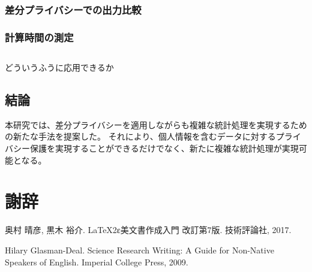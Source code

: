 \documentclass[a4paper,11pt]{jreport}
\begin{document}
\subsection{差分プライバシーでの出力比較}

\subsection{計算時間の測定}

\section{}
どういうふうに応用できるか

\section{結論}
本研究では、差分プライバシーを適用しながらも複雑な統計処理を実現するための新たな手法を提案した。
それにより、個人情報を含むデータに対するプライバシー保護を実現することができるだけでなく、新たに複雑な統計処理が実現可能となる。

\chapter*{謝辞}

\newpage

\renewcommand{\bibname}{参考文献}

%
%

\begin{thebibliography}{1}
奥村 晴彦, 黒木 裕介.
\newblock LaTeX2ε美文書作成入門 改訂第7版.
\newblock 技術評論社, 2017.

Hilary Glasman-Deal.
\newblock Science Research Writing: A Guide for Non-Native Speakers of English.
\newblock Imperial College Press, 2009.
\end{thebibliography}
\end{document}

